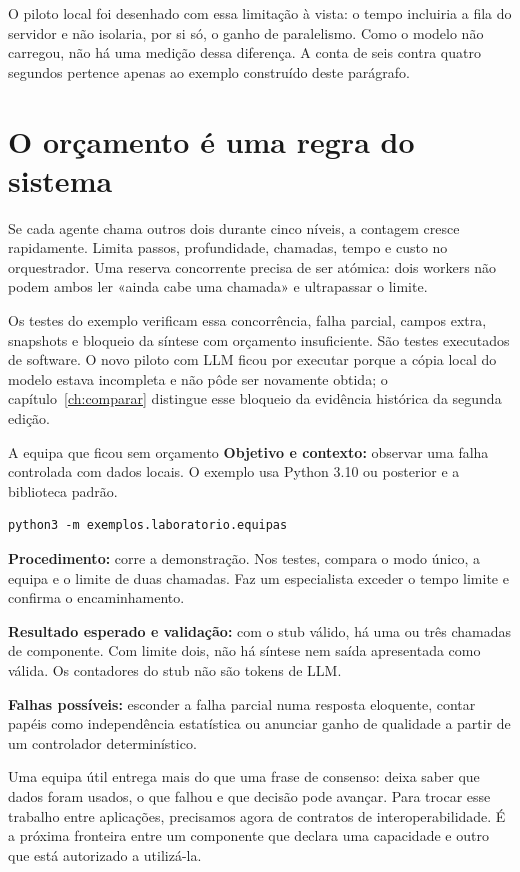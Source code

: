 O piloto local foi desenhado com essa limitação à vista: o tempo incluiria a fila do servidor e não isolaria, por si só, o ganho de paralelismo. Como o modelo não carregou, não há uma medição dessa diferença. A conta de seis contra quatro segundos pertence apenas ao exemplo construído deste parágrafo.

\section{O orçamento é uma regra do sistema}
Se cada agente chama outros dois durante cinco níveis, a contagem cresce rapidamente. Limita passos, profundidade, chamadas, tempo e custo no orquestrador. Uma reserva concorrente precisa de ser atómica: dois workers não podem ambos ler «ainda cabe uma chamada» e ultrapassar o limite.

Os testes do exemplo verificam essa concorrência, falha parcial, campos extra, snapshots e bloqueio da síntese com orçamento insuficiente. São testes executados de software. O novo piloto com LLM ficou por executar porque a cópia local do modelo estava incompleta e não pôde ser novamente obtida; o capítulo~\ref{ch:comparar} distingue esse bloqueio da evidência histórica da segunda edição.

\begin{promptlabbox}{A equipa que ficou sem orçamento}
\textbf{Objetivo e contexto:} observar uma falha controlada com dados locais. O exemplo usa Python 3.10 ou posterior e a biblioteca padrão.

\begin{lstlisting}
python3 -m exemplos.laboratorio.equipas
\end{lstlisting}

\textbf{Procedimento:} corre a demonstração. Nos testes, compara o modo único, a equipa e o limite de duas chamadas. Faz um especialista exceder o tempo limite e confirma o encaminhamento.

\textbf{Resultado esperado e validação:} com o stub válido, há uma ou três chamadas de componente. Com limite dois, não há síntese nem saída apresentada como válida. Os contadores do stub não são tokens de LLM.

\textbf{Falhas possíveis:} esconder a falha parcial numa resposta eloquente, contar papéis como independência estatística ou anunciar ganho de qualidade a partir de um controlador determinístico.
\end{promptlabbox}

Uma equipa útil entrega mais do que uma frase de consenso: deixa saber que dados foram usados, o que falhou e que decisão pode avançar. Para trocar esse trabalho entre aplicações, precisamos agora de contratos de interoperabilidade. É a próxima fronteira entre um componente que declara uma capacidade e outro que está autorizado a utilizá-la.
